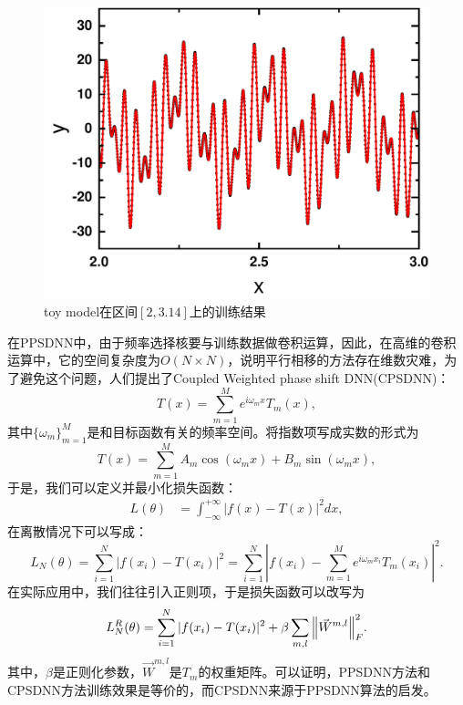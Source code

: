 \begin{figure}[htbp]
  \centering
  \includegraphics[width=0.76\linewidth]{figures/toymodel/train3.pdf}
  \caption{toy model在区间$[2,3.14]$上的训练结果}
  \label{toy3}
\end{figure}
  


  在PPSDNN中，由于频率选择核要与训练数据做卷积运算，因此，在高维的卷积运算中，它的空间复杂度为$O (N\times N)$，说明平行相移的方法存在维数灾难，为了避免这个问题，人们提出了Coupled Weighted phase shift DNN\cite{cai2020phase}(CPSDNN)：
  \begin{equation} \label{eq:CPDNNcomplex}%
    T(x)=\sum_{m=1}^{M}e^{i\omega_{m}x}T_{m}(x),
    \end{equation}
    其中$\{\omega_{m}\}_{m=1}^M$是和目标函数有关的频率空间。将指数项写成实数的形式为
    \begin{equation}\label{eq:CPDNNreal}%
      T(x)=\sum_{m=1}^{M}A_{m}\cos(\omega_{m}x)+B_{m}\sin(\omega_{m}x),
      \end{equation}
    于是，我们可以定义并最小化损失函数：
    \begin{equation}
      \begin{aligned}
      L(\theta) &= \int_{-\infty}^{+\infty}|f(x)-T(x)|^2d x,\label{eq:2}%
      \end{aligned}
      \end{equation}
      在离散情况下可以写成：
      \begin{equation}
        L_N(\theta) = \sum_{i=1}^{N}\left\vert
        f(x_{i})-T(x_{i})\right\vert ^{2}
        =\sum_{i=1}^{N}\left\vert f(x_{i})-\sum_{m=1}^{M}e^{i\omega_{m}x_{i}}T_{m}(x_{i})\right\vert ^{2}. \label{eq:Ln2}%
        \end{equation}
在实际应用中，我们往往引入正则项，于是损失函数可以改写为
\begin{equation}
  L_N^R(\theta) = \sum_{i=1}^{N}|f(x_i) - T(x_i)|^2 + \beta \sum_{m,l} \norm{\vec{W}^{m, l}}_F^2.
  \end{equation}
  其中，$\beta$是正则化参数，$\vec{W}^{m, l}$是$T_m$的权重矩阵。可以证明，PPSDNN方法和CPSDNN方法训练效果是等价的，而CPSDNN来源于PPSDNN算法的启发。

